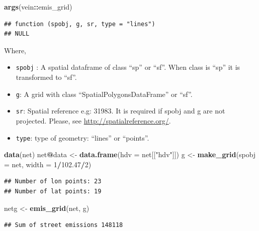 \documentclass[12pt,graybox,envcountchap,sectrefs]{krantz}
\makeatletter
\newenvironment{Shaded}{\begin{snugshade}}{\end{snugshade}}
\newcommand{\KeywordTok}[1]{\textcolor[rgb]{0.13,0.29,0.53}{\textbf{#1}}}
\newcommand{\DataTypeTok}[1]{\textcolor[rgb]{0.13,0.29,0.53}{#1}}
\newcommand{\DecValTok}[1]{\textcolor[rgb]{0.00,0.00,0.81}{#1}}
\newcommand{\FloatTok}[1]{\textcolor[rgb]{0.00,0.00,0.81}{#1}}
\newcommand{\StringTok}[1]{\textcolor[rgb]{0.31,0.60,0.02}{#1}}
\newcommand{\OperatorTok}[1]{\textcolor[rgb]{0.81,0.36,0.00}{\textbf{#1}}}
\newcommand{\NormalTok}[1]{#1}
\providecommand{\tightlist}{%
  \setlength{\itemsep}{0pt}\setlength{\parskip}{0pt}}
\newenvironment{kframe}{%
\medskip{}
\setlength{\fboxsep}{.8em}
 \def\at@end@of@kframe{}%
 \ifinner\ifhmode%
  \def\at@end@of@kframe{\end{minipage}}%
  \begin{minipage}{\columnwidth}%
 \fi\fi%
 \def\FrameCommand##1{\hskip\@totalleftmargin \hskip-\fboxsep
 \colorbox{shadecolor}{##1}\hskip-\fboxsep
     \hskip-\linewidth \hskip-\@totalleftmargin \hskip\columnwidth}%
 \MakeFramed {\advance\hsize-\width
   \@totalleftmargin\z@ \linewidth\hsize
   \@setminipage}}%
 {\par\unskip\endMakeFramed%
 \at@end@of@kframe}
\renewenvironment{Shaded}{\begin{kframe}}{\end{kframe}}
\theoremstyle{definition}
\theoremstyle{definition}
\theoremstyle{definition}
\theoremstyle{remark}
\makeatother
\begin{document}
\begin{Shaded}
\begin{Highlighting}[]
\KeywordTok{args}\NormalTok{(vein}\OperatorTok{::}\NormalTok{emis_grid)}
\end{Highlighting}
\end{Shaded}

\begin{verbatim}
## function (spobj, g, sr, type = "lines") 
## NULL
\end{verbatim}

Where,

\begin{itemize}
\tightlist
\item
  \texttt{spobj} : A spatial dataframe of class ``sp'' or ``sf''. When
  class is ``sp'' it is transformed to ``sf''.
\item
  \texttt{g}: A grid with class ``SpatialPolygonsDataFrame'' or ``sf''.
\item
  \texttt{sr}: Spatial reference e.g: 31983. It is required if spobj and
  g are not projected. Please, see \url{http://spatialreference.org/}.
\item
  \texttt{type}: type of geometry: ``lines'' or ``points''.
\end{itemize}

\begin{Shaded}
\begin{Highlighting}[]
\KeywordTok{data}\NormalTok{(net)}
\NormalTok{net}\OperatorTok{@}\NormalTok{data <-}\StringTok{ }\KeywordTok{data.frame}\NormalTok{(}\DataTypeTok{hdv =}\NormalTok{ net[[}\StringTok{"hdv"}\NormalTok{]])}
\NormalTok{g <-}\StringTok{ }\KeywordTok{make_grid}\NormalTok{(}\DataTypeTok{spobj =}\NormalTok{ net, }\DataTypeTok{width =} \DecValTok{1}\OperatorTok{/}\FloatTok{102.47}\OperatorTok{/}\DecValTok{2}\NormalTok{)}
\end{Highlighting}
\end{Shaded}

\begin{verbatim}
## Number of lon points: 23
## Number of lat points: 19
\end{verbatim}

\begin{Shaded}
\begin{Highlighting}[]
\NormalTok{netg <-}\StringTok{ }\KeywordTok{emis_grid}\NormalTok{(net, g)}
\end{Highlighting}
\end{Shaded}

\begin{verbatim}
## Sum of street emissions 148118
\end{verbatim}
\end{document}
